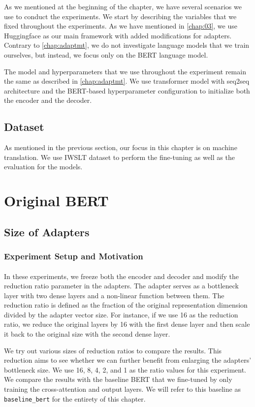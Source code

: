 As we mentioned at the beginning of the chapter, we have several scenarios we use to conduct the experiments. We start by describing the variables that we fixed throughout the experiments. As we have mentioned in \cref{chap:03}, we use Huggingface as our main framework with added modifications for adapters. Contrary to \cref{chap:adaptmt}, we do not investigate language models that we train ourselves, but instead, we focus only on the BERT language model.

The model and hyperparameters that we use throughout the experiment remain the same as described in \cref{chap:adaptmt}. We use transformer model with seq2seq architecture and the BERT-based hyperparameter configuration to initialize both the encoder and the decoder.

\subsection{Dataset}
As mentioned in the previous section, our focus in this chapter is on machine translation. We use IWSLT dataset to perform the fine-tuning as well as the evaluation for the models.

\section{Original BERT}
\subsection{Size of Adapters}
\subsubsection{Experiment Setup and Motivation}
\paragraph{}
In these experiments, we freeze both the encoder and decoder and modify the reduction ratio parameter in the adapters. The adapter serves as a bottleneck layer with two dense layers and a non-linear function between them. The reduction ratio is defined as the fraction of the original representation dimension divided by the adapter vector size. For instance, if we use 16 as the reduction ratio, we reduce the original layers by 16 with the first dense layer and then scale it back to the original size with the second dense layer.

We try out various sizes of reduction ratios to compare the results. This reduction aims to see whether we can further benefit from enlarging the adapters' bottleneck size. We use 16, 8, 4, 2, and 1 as the ratio values for this experiment. We compare the results with the baseline BERT that we fine-tuned by only training the cross-attention and output layers. We will refer to this baseline as \texttt{baseline\_bert} for the entirety of this chapter.

